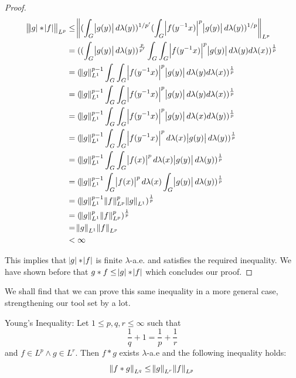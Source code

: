 \begin{proof}
\begin{align*}
\norm{\abs{g} \ast \abs{f}}_{L^p} &\leq
\norm{(\int_G \abs{g(y)} 
 d\lambda(y))^{1/p'}(\int_G \abs{f(y^{-1}x)}^p \abs{g(y)} d\lambda(y))^{1/p} }_{L^p} \\
&= ((\int_G \abs{g(y)} d\lambda(y))^\frac{p}{p'} \int_G \int_G \abs{f(y^{-1}x)}^p \abs{g(y)} d\lambda(y)d\lambda(x) )^\frac{1}{p} \\
&= (\norm{g}^{p-1}_{L^1} \int_G \int_G \abs{f(y^{-1}x)}^p \abs{g(y)} d\lambda(y)d\lambda(x) )^\frac{1}{p} \\
&= (\norm{g}^{p-1}_{L^1} \int_G \int_G \abs{f(y^{-1}x)}^p \abs{g(y)} d\lambda(y)d\lambda(x) )^\frac{1}{p} \\
&= (\norm{g}^{p-1}_{L^1} \int_G \int_G \abs{f(y^{-1}x)}^p \abs{g(y)} d\lambda(x)d\lambda(y) )^\frac{1}{p} \\
&= (\norm{g}^{p-1}_{L^1} \int_G \int_G \abs{f(y^{-1}x)}^p  d\lambda(x) \abs{g(y)} d\lambda(y) )^\frac{1}{p} \\
&= (\norm{g}^{p-1}_{L^1} \int_G \int_G \abs{f(x)}^p  d\lambda(x) \abs{g(y)} d\lambda(y) )^\frac{1}{p} \\
&= (\norm{g}^{p-1}_{L^1} \int_G \abs{f(x)}^p  d\lambda(x) \int_G  \abs{g(y)} d\lambda(y) )^\frac{1}{p} \\
&= (\norm{g}^{p-1}_{L^1} \norm{f}^p_{L^p} \norm{g}_{L^1})^\frac{1}{p} \\
&= (\norm{g}^{p}_{L^1} \norm{f}^p_{L^p})^\frac{1}{p} \\
&= \norm{g}_{L^1} \norm{f}_{L^p}\\
&< \infty
\end{align*}

This implies that $\abs{g}\ast\abs{f}$ is finite $\lambda$-a.e. and satisfies the required inequality. We have shown before that $ g \ast f \leq \abs{g}\ast\abs{f}$ which concludes our proof.

\end{proof}

We shall find that we can prove this same inequality in a more general case, strengthening our tool set by a lot.

\begin{theorem}
Young's Inequality: Let $1 \leq p,q,r \leq \infty$ such that
\begin{equation*}
\frac{1}{q} + 1 = \frac{1}{p}+\frac{1}{r}
\end{equation*}
and $f \in L^p \wedge g\in L^r$. Then $f \ast g$ exists $\lambda$-a.e and the following inequality holds:
\begin{equation*}
\norm{f \ast g}_{L^q} \leq \norm{g}_{L^r}\norm{f}_{L^p}
\end{equation*}
\end{theorem}


